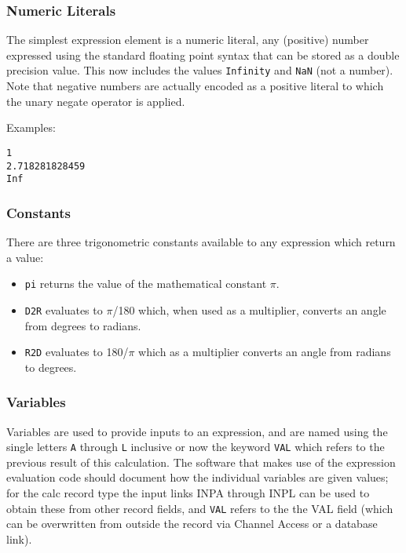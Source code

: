 \subsubsection{Numeric Literals}

The simplest expression element is a numeric literal, any (positive) number expressed using the standard floating point 
syntax that can be stored as a double precision value. This now includes the values \verb|Infinity| and \verb|NaN| (not a number). 
Note that negative numbers are actually encoded as a positive literal to which the unary negate operator is applied.

Examples:

\begin{verbatim}1
2.718281828459
Inf
\end{verbatim}\subsubsection{Constants}

There are three trigonometric constants available to any expression which return a value:

\begin{itemize}\item \verb|pi| returns the value of the mathematical constant $\pi$.

\item \verb|D2R| evaluates to $\pi$/180 which, when used as a multiplier, converts an angle from degrees to radians.

\item \verb|R2D| evaluates to 180/$\pi$ which as a multiplier converts an angle from radians to degrees.

\end{itemize}\subsubsection{Variables}

Variables are used to provide inputs to an expression, and are named using the single letters \verb|A| through \verb|L| inclusive or now 
the keyword \verb|VAL| which refers to the previous result of this calculation. The software that makes use of the expression 
evaluation code should document how the individual variables are given values; for the calc record type the input links 
INPA through INPL can be used to obtain these from other record fields, and \verb|VAL| refers to the the VAL field (which can 
be overwritten from outside the record via Channel Access or a database link).

